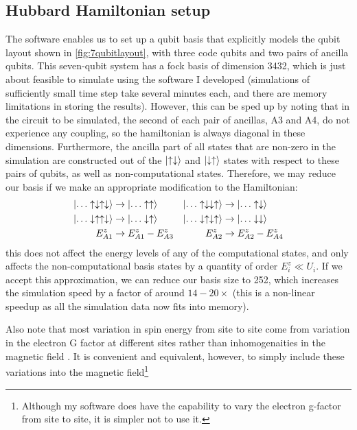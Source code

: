 \documentclass{report}
\begin{document}
\subsection{Hubbard Hamiltonian setup} \label{sec:reduced_basis_approx}
The software enables us to set up a qubit basis that explicitly models the qubit layout shown in \ref{fig:7qubitlayout}, with three code qubits and two pairs of ancilla qubits. This seven-qubit system has a fock basis of dimension 3432, which is just about feasible to simulate using the software I developed (simulations of sufficiently small time step take several minutes each, and there are memory limitations in storing the results). However, this can be sped up by noting that in the circuit to be simulated, the second of each pair of ancillas, A3 and A4, do not experience any coupling, so the hamiltonian is always diagonal in these dimensions. Furthermore, the ancilla part of all states that are non-zero in the simulation are constructed out of the $\ket{\uparrow\downarrow}$ and $\ket{\downarrow\uparrow}$ states with respect to these pairs of qubits, as well as non-computational states. Therefore, we may reduce our basis if we make an appropriate modification to the Hamiltonian:
\begin{align*}
    \ket{\dots \uparrow\downarrow\uparrow\downarrow} &\rightarrow \ket{\dots \uparrow\uparrow} &
    \ket{\dots \uparrow\downarrow\downarrow\uparrow} &\rightarrow \ket{\dots \uparrow\downarrow}\\
    \ket{\dots \downarrow\uparrow\uparrow\downarrow} &\rightarrow \ket{\dots \downarrow\uparrow} &
    \ket{\dots \downarrow\uparrow\downarrow\uparrow} &\rightarrow \ket{\dots \downarrow\downarrow}\\
    E_{A1}^z &\rightarrow E_{A1}^z - E_{A3}^z & E_{A2}^z &\rightarrow E_{A2}^z - E_{A4}^z
\end{align*} this does not affect the energy levels of any of the computational states, and only affects the non-computational basis states by a quantity of order $E_i^z \ll U_i$. If we accept this approximation, we can reduce our basis size to 252, which increases the simulation speed by a factor of around $14 - 20\times$ (this is a non-linear speedup as all the simulation data now fits into memory).

Also note that most variation in spin energy from site to site come from variation in the electron G factor at different sites rather than inhomogenaities in the magnetic field \cite{Hwang2017}. It is convenient and equivalent, however, to simply include these variations into the magnetic field\footnote{Although my software does have the capability to vary the electron g-factor from site to site, it is simpler not to use it. }
\end{document}
